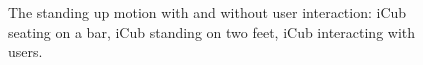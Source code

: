 \documentclass[12pt,a4paper,twoside]{article}
\begin{document}
\begin{figure}[!h]
\centering
{}
\caption{The standing up motion with and without user interaction: \protect{} iCub seating on a bar, \protect{} iCub standing on two feet, \protect{} iCub interacting with users.}
\label{fig:standingUp}

\end{figure}
\end{document}
